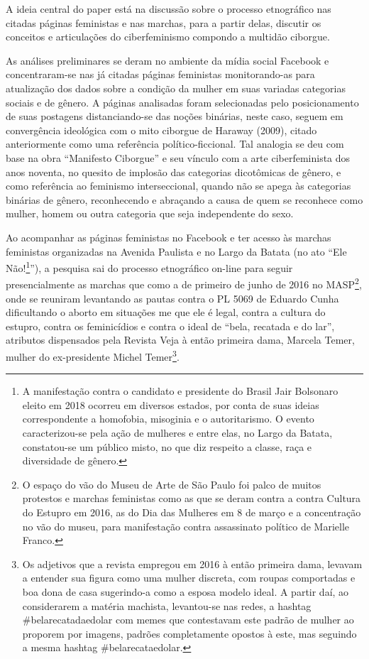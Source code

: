 A ideia central do paper está na discussão sobre o processo etnográfico
nas citadas páginas feministas e nas marchas, para a partir delas,
discutir os conceitos e articulações do ciberfeminismo compondo a
multidão ciborgue.

As análises preliminares se deram no ambiente da mídia social Facebook e
concentraram-se nas já citadas páginas feministas monitorando-as para
atualização dos dados sobre a condição da mulher em suas variadas
categorias sociais e de gênero. A páginas analisadas foram selecionadas
pelo posicionamento de suas postagens distanciando-se das noções
binárias, neste caso, seguem em convergência ideológica com o mito
ciborgue de Haraway (2009), citado anteriormente como uma referência
político-ficcional. Tal analogia se deu com base na obra ``Manifesto
Ciborgue'' e seu vínculo com a arte ciberfeminista dos anos noventa, no
quesito de implosão das categorias dicotômicas de gênero, e como
referência ao feminismo interseccional, quando não se apega às
categorias binárias de gênero, reconhecendo e abraçando a causa de quem
se reconhece como mulher, homem ou outra categoria que seja independente
do sexo.

Ao acompanhar as páginas feministas no Facebook e ter acesso às marchas
feministas organizadas na Avenida Paulista e no Largo da Batata (no ato
``Ele Não!\footnote{A manifestação contra o candidato e presidente do
  Brasil Jair Bolsonaro eleito em 2018 ocorreu em diversos estados, por
  conta de suas ideias correspondente a homofobia, misoginia e o
  autoritarismo. O evento caracterizou-se pela ação de mulheres e entre
  elas, no Largo da Batata, constatou-se um público misto, no que diz
  respeito a classe, raça e diversidade de gênero.}''), a pesquisa sai
do processo etnográfico on-line para seguir presencialmente as marchas
que como a de primeiro de junho de 2016 no MASP\footnote{O espaço do vão
  do Museu de Arte de São Paulo foi palco de muitos protestos e marchas
  feministas como as que se deram contra a contra Cultura do Estupro em
  2016, as do Dia das Mulheres em 8 de março e a concentração no vão do
  museu, para manifestação contra assassinato político de Marielle
  Franco.}, onde se reuniram levantando as pautas contra o PL 5069 de
Eduardo Cunha dificultando o aborto em situações me que ele é legal,
contra a cultura do estupro, contra os feminicídios e contra o ideal de
``bela, recatada e do lar'', atributos dispensados pela Revista Veja à
então primeira dama, Marcela Temer, mulher do ex-presidente Michel
Temer\footnote{Os adjetivos que a revista empregou em 2016 à então
  primeira dama, levavam a entender sua figura como uma mulher discreta,
  com roupas comportadas e boa dona de casa sugerindo-a como a esposa
  modelo ideal. A partir daí, ao considerarem a matéria machista,
  levantou-se nas redes, a hashtag \#belarecatadaedolar com memes que
  contestavam este padrão de mulher ao proporem por imagens, padrões
  completamente opostos à este, mas seguindo a mesma hashtag
  \#belarecataedolar.}.

